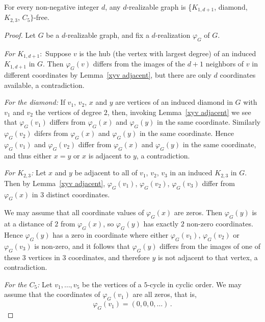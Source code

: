 \documentclass[12pt,a4paper,titlepage,openany]{report}
\begin{document}
\begin{theorem}\label{d-realizable-free}
For every non-negative integer $d$, any $d$-realizable graph is \{$K_{1,d+1}$, diamond, $K_{2,3}$, $C_5\}$-free.
\end{theorem}
\begin{proof} Let $G$ be a $d$-realizable graph, and fix a $d$-realization  $\varphi_G$ of $G$.

\textit{For $K_{1,d+1}:$} Suppose $v$ is the hub (the vertex with largest degree) of an induced $K_{1,d+1}$ in $G$. Then $\varphi_G(v)$ differs from the images of the $d+1$ neighbors of $v$ in different coordinates by Lemma~\ref{xyv adjacent}, but there are only $d$ coordinates available, a contradiction.

\textit{For the diamond:} If $v_1$, $v_2$, $x$ and $y$ are vertices of an induced diamond in $G$ with $v_1$ and $v_2$ the vertices of degree $2$, then, invoking Lemma~\ref{xyv adjacent} we see that $\varphi_G(v_1)$ differs from $\varphi_G(x)$ and $\varphi_G(y)$ in the same coordinate. Similarly $\varphi_G(v_2)$ difers from $\varphi_G(x)$ and $\varphi_G(y)$ in the same coordinate.
 Hence $\varphi_G(v_1)$  and $\varphi_G(v_2)$  differ from $\varphi_G(x)$  and $\varphi_G(y)$  in the same coordinate, and thus either $x=y$ or $x$ is adjacent to $y$, a contradiction.

 \textit{For $K_{2,3}$:} Let $x$ and $y$ be adjacent to all of $v_1$, $v_2$, $v_3$ in an induced $K_{2,3}$ in $G$. Then by Lemma~\ref{xyv adjacent}, $\varphi_G(v_1)$, $\varphi_G(v_2)$, $\varphi_G(v_3)$ differ from $\varphi_G(x)$ in $3$ distinct coordinates.

We may assume that all coordinate values of $\varphi_G(x)$ are zeros. Then $\varphi_G(y)$ is at a distance of $2$ from $\varphi_G(x)$, so $\varphi_G(y)$ has exactly $2$ non-zero coordinates. Hence $\varphi_G(y)$ has a zero in coordinate where either $\varphi_G(v_1)$, $\varphi_G(v_2)$ or $\varphi_G(v_3)$ is non-zero, and it follows that $\varphi_G(y)$ differs from the images of one of these $3$ vertices in $3$ coordinates, and therefore $y$ is not adjacent to that vertex, a contradiction.

\textit{For the $C_5$:} Let $v_1,\ldots, v_5$ be the vertices of a $5$-cycle in cyclic order. We may assume that the coordinates of $\varphi_G(v_1)$ are all zeros, that is, $$\varphi_G(v_1)=(0,0,0,\ldots)\,.$$


\end{proof}
\end{document}
